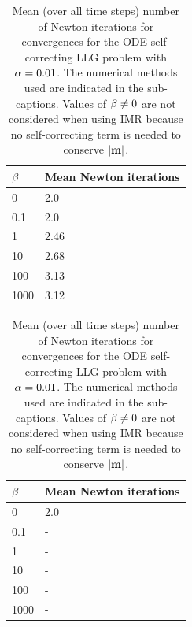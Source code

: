 \begin{table}
  \begin{subtable}[t]{.5\textwidth}
    \centering
    \begin{tabular}{ll}
      $\beta$ & Mean Newton iterations \\
      \hline
      0 & 2.0 \\
      0.1 & 2.0 \\
      1 & 2.46 \\
      10 & 2.68 \\
      100 & 3.13 \\
      1000 & 3.12 \\
    \end{tabular}%
    \caption{Solved with BDF2 and $\ntol = 10^{-8}$}
  \end{subtable}%
  \begin{subtable}[t]{.5\textwidth}
    \centering
    \begin{tabular}{ll}
      $\beta$ & Mean Newton iterations \\
      \hline
      0 & 2.0 \\
      0.1 & - \\
      1 & - \\
      10 & - \\
      100 & - \\
      1000 & - \\
    \end{tabular}%
    \vfill
      \caption{Solved with IMR and $\ntol = 10^{-12}$}
    \end{subtable}%
    \caption{
      Mean (over all time steps) number of Newton iterations for convergences
      for the ODE self-correcting LLG problem with
      $\alpha = 0.01$.
      The numerical methods used are indicated in the sub-captions.
      Values of $\beta \neq 0$ are not considered when using IMR because no self-correcting term is needed to conserve $\left|{\boldsymbol{\mathrm{m}}} \right|$.
    }
\end{table}

